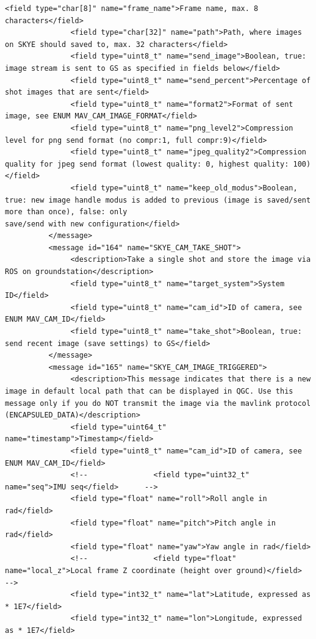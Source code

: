 \begin{lstlisting}[captionpos=b, caption="Definition of \textsc{Skye} specific Mavlink messages", label=app_xml]
               <field type="char[8]" name="frame_name">Frame name, max. 8 characters</field>
               <field type="char[32]" name="path">Path, where images on SKYE should saved to, max. 32 characters</field>
               <field type="uint8_t" name="send_image">Boolean, true: image stream is sent to GS as specified in fields below</field>
               <field type="uint8_t" name="send_percent">Percentage of shot images that are sent</field>
               <field type="uint8_t" name="format2">Format of sent image, see ENUM MAV_CAM_IMAGE_FORMAT</field>
               <field type="uint8_t" name="png_level2">Compression level for png send format (no compr:1, full compr:9)</field>
               <field type="uint8_t" name="jpeg_quality2">Compression quality for jpeg send format (lowest quality: 0, highest quality: 100)</field>
               <field type="uint8_t" name="keep_old_modus">Boolean, true: new image handle modus is added to previous (image is saved/sent more than once), false: only 
save/send with new configuration</field>
          </message>
          <message id="164" name="SKYE_CAM_TAKE_SHOT">
               <description>Take a single shot and store the image via ROS on groundstation</description>
               <field type="uint8_t" name="target_system">System ID</field>
               <field type="uint8_t" name="cam_id">ID of camera, see ENUM MAV_CAM_ID</field>
               <field type="uint8_t" name="take_shot">Boolean, true: send recent image (save settings) to GS</field>
          </message>
          <message id="165" name="SKYE_CAM_IMAGE_TRIGGERED">
               <description>This message indicates that there is a new image in default local path that can be displayed in QGC. Use this message only if you do NOT transmit the image via the mavlink protocol (ENCAPSULED_DATA)</description>
               <field type="uint64_t" name="timestamp">Timestamp</field>
               <field type="uint8_t" name="cam_id">ID of camera, see ENUM MAV_CAM_ID</field>
               <!--               <field type="uint32_t" name="seq">IMU seq</field>      -->
               <field type="float" name="roll">Roll angle in rad</field>
               <field type="float" name="pitch">Pitch angle in rad</field>
               <field type="float" name="yaw">Yaw angle in rad</field>
               <!--               <field type="float" name="local_z">Local frame Z coordinate (height over ground)</field>   -->
               <field type="int32_t" name="lat">Latitude, expressed as * 1E7</field>
               <field type="int32_t" name="lon">Longitude, expressed as * 1E7</field>

\end{lstlisting}
